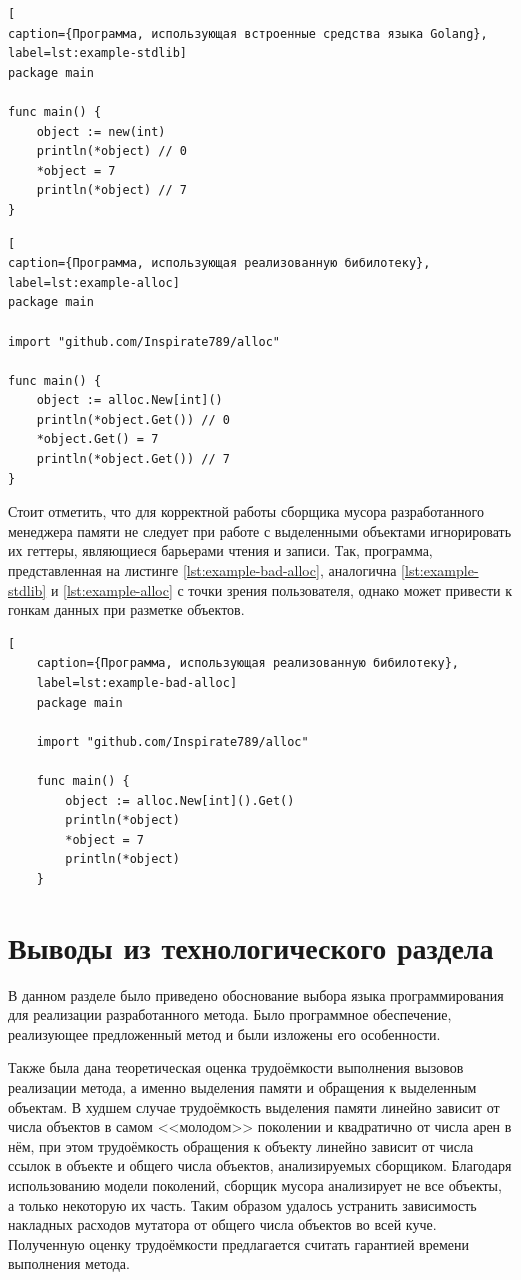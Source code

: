 \begin{lstlisting}[
caption={Программа, использующая встроенные средства языка Golang},
label=lst:example-stdlib]
package main

func main() {
	object := new(int)
	println(*object) // 0
	*object = 7
	println(*object) // 7
}
\end{lstlisting}

\begin{lstlisting}[
caption={Программа, использующая реализованную бибилотеку},
label=lst:example-alloc]
package main

import "github.com/Inspirate789/alloc"

func main() {
	object := alloc.New[int]()
	println(*object.Get()) // 0
	*object.Get() = 7
	println(*object.Get()) // 7
}
\end{lstlisting}

Стоит отметить, что для корректной работы сборщика мусора разработанного менеджера памяти не следует при работе с выделенными объектами игнорировать их геттеры, являющиеся барьерами чтения и записи. Так, программа, представленная на листинге \ref{lst:example-bad-alloc}, аналогична \ref{lst:example-stdlib} и \ref{lst:example-alloc} с точки зрения пользователя, однако может привести к гонкам данных при разметке объектов.

\begin{lstlisting}[
	caption={Программа, использующая реализованную бибилотеку},
	label=lst:example-bad-alloc]
	package main
	
	import "github.com/Inspirate789/alloc"
	
	func main() {
		object := alloc.New[int]().Get()
		println(*object)
		*object = 7
		println(*object)
	}
\end{lstlisting}



\section*{Выводы из технологического раздела}

В данном разделе было приведено обоснование выбора языка программирования для реализации разработанного метода. Было программное обеспечение, реализующее предложенный метод и были изложены его особенности.

Также была дана теоретическая оценка трудоёмкости выполнения вызовов реализации метода, а именно выделения памяти и обращения к выделенным объектам. В худшем случае трудоёмкость выделения памяти линейно зависит от числа объектов в самом <<молодом>> поколении и квадратично от числа арен в нём, при этом трудоёмкость обращения к объекту линейно зависит от числа ссылок в объекте и общего числа объектов, анализируемых сборщиком. Благодаря использованию модели поколений, сборщик мусора анализирует не все объекты, а только некоторую их часть. Таким образом удалось устранить зависимость накладных расходов мутатора от общего числа объектов во всей куче. Полученную оценку трудоёмкости предлагается считать гарантией времени выполнения метода.
